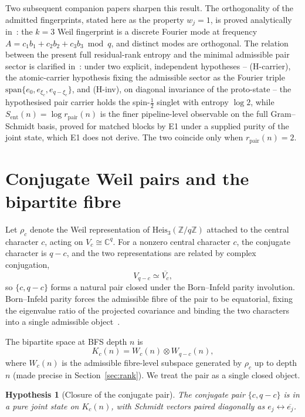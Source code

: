 \documentclass[11pt]{article}
\newtheorem{hypothesis}{Hypothesis}
\newcommand{\Heis}{\mathrm{Heis}}
\newcommand{\Sent}{S_{\mathrm{ent}}}
\newcommand{\rpair}{r_{\mathrm{pair}}}
\begin{document}
    Two subsequent companion papers sharpen this result.
    The orthogonality of the admitted fingerprints, stated here as the property $w_j=1$, is proved
    analytically in~\cite{Beau2026ent1}: the $k{=}3$ Weil fingerprint is a discrete Fourier mode at frequency
    $A=c_1b_1+c_2b_2+c_3b_3 \bmod q$, and distinct modes are orthogonal.
    The relation between the present full residual-rank entropy and the minimal admissible pair sector is
    clarified in~\cite{Beau2026ent2}: under two explicit, independent hypotheses -- (H-carrier), the
    atomic-carrier hypothesis fixing the admissible sector as the Fourier triple
    $\mathrm{span}\{e_0,e_{\xi_c},e_{q-\xi_c}\}$, and (H-inv), on diagonal
    invariance of the proto-state -- the hypothesised pair carrier holds the spin-$\tfrac12$ singlet
    with entropy $\log 2$, while $\Sent(n)=\log\rpair(n)$ is the finer pipeline-level observable on the
    full Gram--Schmidt basis, proved for matched blocks by E1 under a supplied purity of the joint state,
    which E1 does not derive.
    The two coincide only when $\rpair(n)=2$.

  \section{Conjugate Weil pairs and the bipartite fibre}
    \label{sec:pair}

    Let $\rho_c$ denote the Weil representation of $\Heis_3(\mathbb{Z}/q\mathbb{Z})$ attached to the central
    character $c$, acting on $V_c\cong\mathbb{C}^q$.
    For a nonzero central character $c$, the conjugate character is $q-c$, and the two representations are
    related by complex conjugation,
    \[
      V_{q-c}\simeq\overline{V_c},
    \]
    so $\{c,q-c\}$ forms a natural pair closed under the Born--Infeld parity involution.
    Born--Infeld parity forces the admissible fibre of the pair to be equatorial, fixing the eigenvalue ratio
    of the projected covariance and binding the two characters into a single admissible
    object~\cite{Beau2026a34,Beau2026a22}.

    The bipartite space at BFS depth $n$ is
    \[
      K_{c}(n)=W_c(n)\otimes W_{q-c}(n),
    \]
    where $W_c(n)$ is the admissible fibre-level subspace generated by $\rho_c$ up to depth $n$ (made precise in
    Section~\ref{sec:rank}).
    We treat the pair as a single closed object.

    \begin{hypothesis}[Closure of the conjugate pair]
      \label{hyp:closure}
      The conjugate pair $\{c,q-c\}$ is in a pure joint state on $K_c(n)$, with Schmidt vectors paired
      diagonally as $e_j\leftrightarrow\overline{e_j}$.
    \end{hypothesis}
\end{document}
